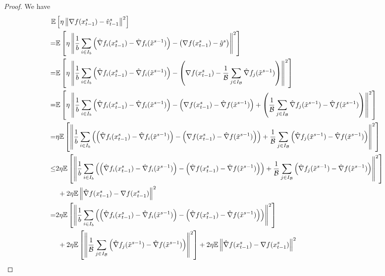 \documentclass{article}
\newcommand*{\E}{\mathbb{E}}
\newcommand{\norm}[1]{\left\lVert#1\right\rVert}
\theoremstyle{definition}
\theoremstyle{remark}
\begin{document}
\begin{proof}
We have
\begin{align}
  \E&\left[\eta\norm{\nabla f(x_{t-1}^s)-{\hat{v}_{t-1}^s}}^2\right]\notag\\
   =&\E\left[\eta\norm{\frac{1}{b}\sum_{i\in I_b}\left(\hat{\nabla} f_i(x_{t-1}^s)-\hat{\nabla} f_i(\tilde{x}^{s-1})\right) - \left(\nabla f(x_{t-1}^s)-\hat{g}^s\right)}^2\right]\notag\\
   =&\E\left[\eta\norm{\frac{1}{b}\sum_{i\in I_b}\left(\hat{\nabla} f_i(x_{t-1}^s)-\hat{\nabla} f_i(\tilde{x}^{s-1})\right) - \left(\nabla f(x_{t-1}^s)-\frac{1}{\mathcal{B}}\sum_{j\in I_{\mathcal{B}}}\hat{\nabla} f_j(\tilde{x}^{s-1})\right)}^2\right]\notag\\
   =&\notag\E\left[\eta\norm{\frac{1}{b}\sum_{i\in I_b}\left(\hat{\nabla} f_i(x_{t-1}^s)-\hat{\nabla} f_i(\tilde{x}^{s-1})\right) - \left(\nabla f(x_{t-1}^s) - \hat{\nabla} f(\tilde{x}^{s-1}) \right)+ \left(\frac{1}{\mathcal{B}}\sum_{j\in I_{\mathcal{B}}}\hat{\nabla} f_j(\tilde{x}^{s-1}) - \hat{\nabla} f(\tilde{x}^{s-1})\right)}^2\right]\\
   =&\notag\eta\E\left[\norm{\frac{1}{b}\sum_{i\in I_b}\left(\left(\hat{\nabla} f_i(x_{t-1}^s)-\hat{\nabla} f_i(\tilde{x}^{s-1})\right) - \left(\nabla f(x_{t-1}^s) - \hat{\nabla} f(\tilde{x}^{s-1}) \right)\right)+ \frac{1}{\mathcal{B}}\sum_{j\in I_{\mathcal{B}}}\left(\hat{\nabla} f_j(\tilde{x}^{s-1}) - \hat{\nabla} f(\tilde{x}^{s-1})\right)}^2\right]\\
   \leq &\notag2\eta\E\left[\norm{\frac{1}{b}\sum_{i\in I_b}\left(\left(\hat{\nabla} f_i(x_{t-1}^s)-\hat{\nabla} f_i(\tilde{x}^{s-1})\right) - \left(\hat{\nabla} f(x_{t-1}^s) - \hat{\nabla} f(\tilde{x}^{s-1}) \right)\right)+ \frac{1}{\mathcal{B}}\sum_{j\in I_{\mathcal{B}}}\left(\hat{\nabla} f_j(\tilde{x}^{s-1}) - \hat{\nabla} f(\tilde{x}^{s-1})\right)}^2\right]\\
   &\,\, + 2\eta \E \norm{\hat{\nabla} f(x_{t-1}^s)-\nabla f(x_{t-1}^s)}^2\label{var-estimate-lem-1}\\
    = &\notag 2 \eta\E\left[\norm{\frac{1}{b}\sum_{i\in I_b}\left(\left(\hat{\nabla} f_i(x_{t-1}^s)-\hat{\nabla} f_i(\tilde{x}^{s-1})\right) - \left(\hat{\nabla} f(x_{t-1}^s) - \hat{\nabla} f(\tilde{x}^{s-1}) \right)\right)}^2\right]\\
   &\,\, +2 \eta \E \left[ \norm{\frac{1}{\mathcal{B}}\sum_{j\in I_{\mathcal{B}}}\left(\hat{\nabla} f_j(\tilde{x}^{s-1}) - \hat{\nabla} f(\tilde{x}^{s-1})\right)}^2\right]+ 2\eta \E \norm{\hat{\nabla} f(x_{t-1}^s)-\nabla f(x_{t-1}^s)}^2\label{var-estimate-lem-2}\\

\end{align}
\end{proof}
\end{document}
